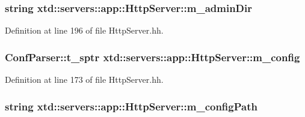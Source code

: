\hypertarget{classxtd_1_1servers_1_1app_1_1HttpServer_ad12543f950574ac8a0d813cb4ceeff4c}{
\subsubsection[{m\-\_\-admin\-Dir}]{\setlength{\rightskip}{0pt plus 5cm}string xtd\-::servers\-::app\-::\-Http\-Server\-::m\-\_\-admin\-Dir\hspace{0.3cm}{\ttfamily [protected]}}}\label{classxtd_1_1servers_1_1app_1_1HttpServer_ad12543f950574ac8a0d813cb4ceeff4c}


Definition at line 196 of file Http\-Server.\-hh.

\hypertarget{classxtd_1_1servers_1_1app_1_1HttpServer_ada282c895467a8d2fcaee543560958dc}{
\subsubsection[{m\-\_\-config}]{\setlength{\rightskip}{0pt plus 5cm}Conf\-Parser\-::t\-\_\-sptr xtd\-::servers\-::app\-::\-Http\-Server\-::m\-\_\-config\hspace{0.3cm}{\ttfamily [protected]}}}\label{classxtd_1_1servers_1_1app_1_1HttpServer_ada282c895467a8d2fcaee543560958dc}


Definition at line 173 of file Http\-Server.\-hh.

\hypertarget{classxtd_1_1servers_1_1app_1_1HttpServer_aa07526617267875dd907e29b99711ab6}{
\subsubsection[{m\-\_\-config\-Path}]{\setlength{\rightskip}{0pt plus 5cm}string xtd\-::servers\-::app\-::\-Http\-Server\-::m\-\_\-config\-Path\hspace{0.3cm}{\ttfamily [protected]}}}\label{classxtd_1_1servers_1_1app_1_1HttpServer_aa07526617267875dd907e29b99711ab6}


